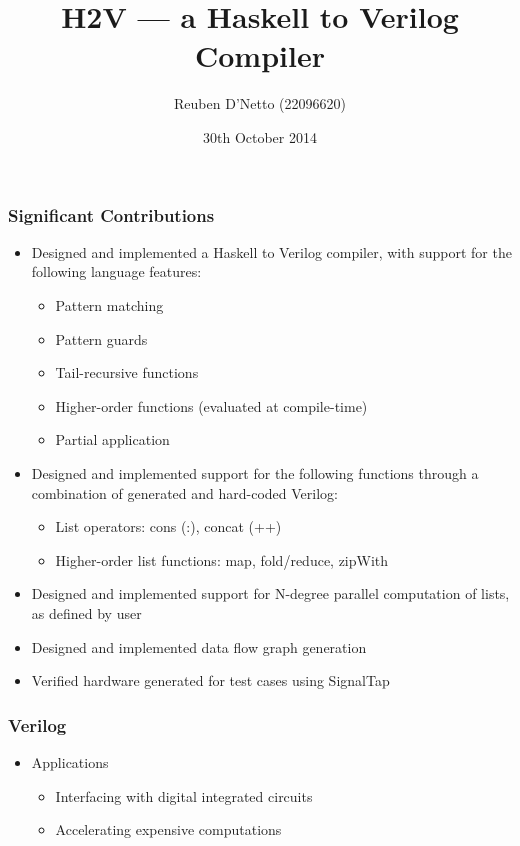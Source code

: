 \documentclass{beamer}
\title{H2V --- a Haskell to Verilog Compiler}
\author{Reuben D'Netto (22096620)}
\date{30th October 2014}
\institute{Supervised by: David Boland}
\begin{document}
\frame{\titlepage}

\begin{frame}
    \frametitle{Significant Contributions}
    \begin{itemize}
        \item Designed and implemented a Haskell to Verilog compiler, with support for the following language features:
            \begin{itemize}
                \item Pattern matching
                \item Pattern guards
                \item Tail-recursive functions
                \item Higher-order functions (evaluated at compile-time)
                \item Partial application
            \end{itemize}
        \item Designed and implemented support for the following functions through a combination of generated and hard-coded Verilog:
            \begin{itemize}
                \item List operators: cons (:), concat (++)
                \item Higher-order list functions: map, fold/reduce, zipWith
            \end{itemize}
        \item Designed and implemented support for N-degree parallel computation of lists, as defined by user
        \item Designed and implemented data flow graph generation
        \item Verified hardware generated for test cases using SignalTap
    \end{itemize}
\end{frame}

{%

}


\begin{frame}[t]
    \frametitle{Verilog}
    \begin{itemize}
        \item Applications
            \begin{itemize}
                \item Interfacing with digital integrated circuits
                \item Accelerating expensive computations
            \end{itemize}
    \end{itemize}
\end{frame}
\end{document}
